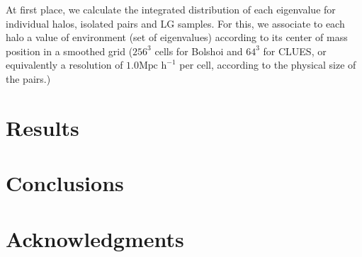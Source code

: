 \documentclass[usenatbib]{latex/mn2e}
\begin{document}
At first place, we calculate the integrated distribution of each 
eigenvalue for individual halos, isolated pairs and LG samples. For this, 
we associate to each halo a value of environment (set of eigenvalues)
according to its center of mass position in a smoothed grid ($256^3$ 
cells for Bolshoi and $64^3$ for CLUES, or equivalently a resolution of 
$1.0 \mbox{Mpc h}^{-1} $ per cell, according to the physical size of the 
pairs.)

\section{Results}
\label{sec:Results}


\section{Conclusions}
\label{sec:conclusions}


\section*{Acknowledgments}  



 
\end{document}
